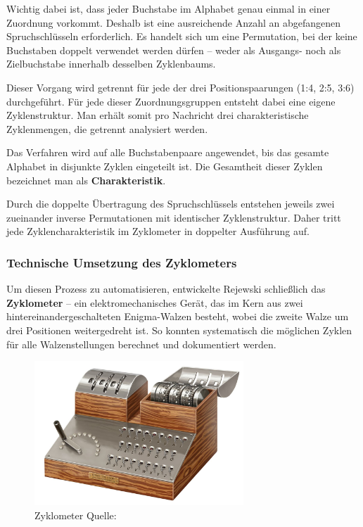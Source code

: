 \documentclass[12pt, ngerman, a4paper, numbers=noenddot]{article}
\begin{document}
Wichtig dabei ist, dass jeder Buchstabe im Alphabet genau einmal in einer Zuordnung vorkommt. Deshalb ist eine ausreichende Anzahl an abgefangenen Spruchschlüsseln erforderlich. Es handelt sich um eine Permutation, bei der keine Buchstaben doppelt verwendet werden dürfen – weder als Ausgangs- noch als Zielbuchstabe innerhalb desselben Zyklenbaums.


Dieser Vorgang wird getrennt für jede der drei Positionspaarungen (1:4, 2:5, 3:6) durchgeführt. Für jede dieser Zuordnungsgruppen entsteht dabei eine eigene Zyklenstruktur. Man erhält somit pro Nachricht drei charakteristische Zyklenmengen, die getrennt analysiert werden.

Das Verfahren wird auf alle Buchstabenpaare angewendet, bis das gesamte Alphabet in disjunkte Zyklen eingeteilt ist. Die Gesamtheit dieser Zyklen bezeichnet man als \textbf{Charakteristik}.

Durch die doppelte Übertragung des Spruchschlüssels entstehen jeweils zwei zueinander inverse Permutationen mit identischer Zyklenstruktur. Daher tritt jede Zyklencharakteristik im Zyklometer in doppelter Ausführung auf.

\newpage
\subsubsection{Technische Umsetzung des Zyklometers}

Um diesen Prozess zu automatisieren, entwickelte Rejewski schließlich das \textbf{Zyklometer} – ein elektromechanisches Gerät, das im Kern aus zwei hintereinandergeschalteten Enigma-Walzen besteht, wobei die zweite Walze um drei Positionen weitergedreht ist. So konnten systematisch die möglichen Zyklen für alle Walzenstellungen berechnet und dokumentiert werden.


\begin{figure}[H]
	\centering
	\includegraphics[width=0.7\textwidth]{bilder/Zyklometer.jpg}
	\caption{Zyklometer Quelle: \cite{wiki:zyklometer}}
	\label{fig:Zyklometer}
\end{figure}
\end{document}
